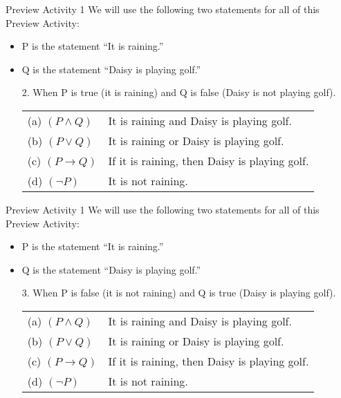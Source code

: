 \documentclass{beamer}
\begin{document}
\begin{frame}{Preview Activity 1}
	We will use the following two statements for all of this Preview Activity:
	\begin{itemize}
		\item P is the statement ``It is raining.''
		\item Q is the statement ``Daisy is playing golf.''
	\end{itemize}
	\begin{enumerate}
		\item[2.]  When P is true (it is raining) and Q is false (Daisy is not playing golf).\\[.1 in]
		\begin{tabular}{ll}
			(a) $(P \wedge Q)$ & It is raining and Daisy is playing golf.\\[.1 in]
			(b) $(P \vee Q)$ & It is raining or Daisy is playing golf.\\[.1 in]
			(c) $(P \to Q)$ & If it is raining, then Daisy is playing golf.\\[.1 in]
			(d) $(\neg P)$ & It is not raining.
		\end{tabular}
	\end{enumerate}
\end{frame}

\begin{frame}{Preview Activity 1}
	We will use the following two statements for all of this Preview Activity:
	\begin{itemize}
		\item P is the statement ``It is raining.''
		\item Q is the statement ``Daisy is playing golf.''
	\end{itemize}
	\begin{enumerate}
		\item[3.]  When P is false (it is not raining) and Q is true (Daisy is playing golf).\\[.1 in]
		\begin{tabular}{ll}
			(a) $(P \wedge Q)$ & It is raining and Daisy is playing golf.\\[.1 in]
			(b) $(P \vee Q)$ & It is raining or Daisy is playing golf.\\[.1 in]
			(c) $(P \to Q)$ & If it is raining, then Daisy is playing golf.\\[.1 in]
			(d) $(\neg P)$ & It is not raining.
		\end{tabular}
	\end{enumerate}
\end{frame}
\end{document}
